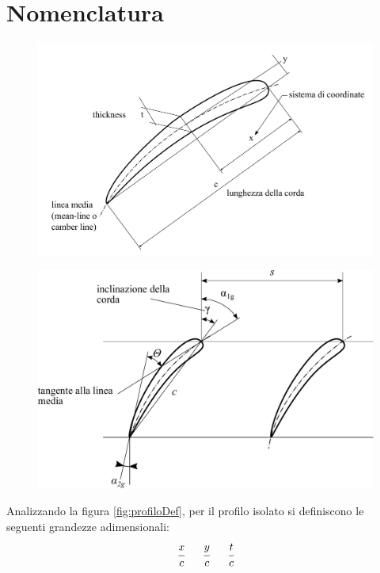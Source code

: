 \section{Nomenclatura}
\begin{figure}[h!]
\centering
\begin{minipage}{.5\textwidth}
  \centering
  \includegraphics[width=\linewidth]{fig/profiloDef.pdf}
  \label{fig:profiloDef}
\end{minipage}
\begin{minipage}{.48\textwidth}
  \centering
  \includegraphics[width=.98\linewidth]{fig/schiera_2.pdf}
  \label{fig:schiera_2}
\end{minipage}
\end{figure}
Analizzando la figura \ref{fig:profiloDef}, per il profilo isolato si definiscono le seguenti grandezze adimensionali:
\begin{align*}
\cfrac{x}{c} \;\;\;\;\;\; \cfrac{y}{c} \;\;\;\;\;\; \cfrac{t}{c}
\end{align*}

